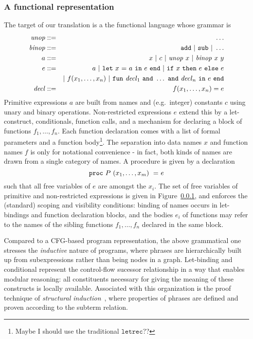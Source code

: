 \subsubsection{A functional representation}
The target of our translation is a the
functional language whose grammar is
\begin{eqnarray*}
\uopsymbol & ::= & \ldots\\
\bopsymbol & ::= & \mathtt{add} \ | \ \mathtt{sub} \ | \ \ldots\\
a & ::= & x \ | \ c \ | \ \uop x \ | \ \bop x y\\
e & ::= & a \ | \ \letin x a e \ | \ \ite x e e \\
      & & | \ \call f {x_1,\ldots,x_n} \ | \ \letrec {\decl_1 \ \mathtt{and}\ \ldots \ \mathtt{and}\ \decl_n} e\\
\decl & ::= & f(x_1,\ldots,x_n) = e
\end{eqnarray*}
Primitive expressions $a$ are built from names and (e.g.~integer)
constants $c$ using unary and binary operations. Non-restricted
expressions $e$ extend this by a let-construct, conditionals, function
calls, and a mechanism for declaring a block of functions
$f_1,\ldots,f_n$. Each function declaration comes with a list of
formal parameters and a function body\footnote{Maybe I should use the
traditional $\mathtt{letrec}$??}. The separation into data names $x$
and function names $f$ is only for notational convenience - in fact,
both kinds of names are drawn from a single category of names. A
procedure is given by a declaration $$\mathtt{proc}\  {P}\ \mathtt{(}{x_1,\ldots,x_m}\mathtt{)\ =} \ {e}$$ such
that all free variables of $e$ are amongst the $x_i$. The set of free
variables of primitive and non-restricted expressions is given in
Figure~\ref{}, and enforces the (standard) scoping and visibility
conditions: binding of names occurs in let-bindings and function
declaration blocks, and the bodies $e_i$ of functions may refer to 
the names of the sibling functions $f_1,\ldots,f_n$ declared in the
same block.

Compared to a CFG-based program representation, the above grammatical
one stresses the \emph{inductive} nature of programs, where phrases
are hierarchically built up from subexpressions rather than being
nodes in a graph. Let-binding and conditional represent the
control-flow sucessor relationship in a way that enables modular
reasoning: all constituents necessary for giving the meaning of these
constructs is locally available. Associated with this organization is
the proof technique of \emph{structural
induction}~\cite{McCarthy63abasis,Burstall:1969}, where properties of
phrases are defined and proven according to the subterm relation.

